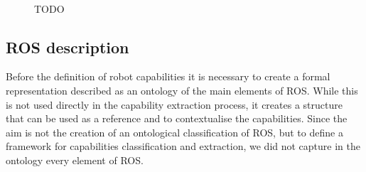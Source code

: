 \begin{figure}
    \myfloatalign
     \\
    \caption[TODO]{TODO}\label{fig:ros-onto}
\end{figure}

\subsection{ROS description}
\label{sec:ros-desc}
Before the definition of robot capabilities it is necessary to create a formal representation described as an ontology of the main elements of ROS. While this is not used directly in the capability extraction process, it creates a structure that can be used as a reference and to contextualise the capabilities. Since the aim is not the creation of an ontological classification of ROS, but to define a framework for capabilities classification and extraction, we did not capture in the ontology every element of ROS. 

